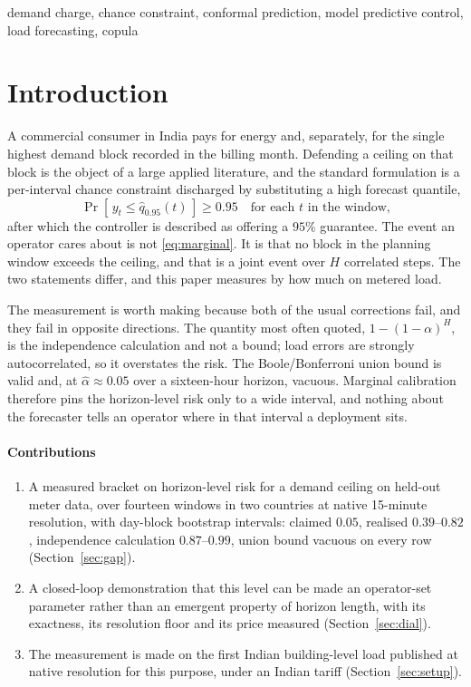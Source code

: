 \documentclass[conference]{IEEEtran}
\begin{document}
\begin{IEEEkeywords}
demand charge, chance constraint, conformal prediction, model predictive
control, load forecasting, copula
\end{IEEEkeywords}

\section{Introduction}

A commercial consumer in India pays for energy and, separately, for the single
highest demand block recorded in the billing month. Defending a ceiling on that
block is the object of a large applied literature, and the standard
formulation is a per-interval chance constraint discharged by substituting a
high forecast quantile,
\begin{equation}
\label{eq:marginal}
\Pr\!\left[\,y_t \le \hat q_{0.95}(t)\,\right] \ge 0.95
\quad \text{for each } t \text{ in the window,}
\end{equation}
after which the controller is described as offering a $95\%$ guarantee. The
event an operator cares about is not \eqref{eq:marginal}. It is that no block
in the planning window exceeds the ceiling, and that is a joint event over $H$
correlated steps. The two statements differ, and this paper measures by how
much on metered load.

The measurement is worth making because both of the usual corrections fail, and
they fail in opposite directions. The quantity most often quoted,
$1-(1-\alpha)^{H}$, is the independence calculation and not a bound; load
errors are strongly autocorrelated, so it overstates the risk. The
Boole/Bonferroni union bound is valid and, at $\hat\alpha\approx0.05$ over a
sixteen-hour horizon, vacuous. Marginal calibration therefore pins the
horizon-level risk only to a wide interval, and nothing about the forecaster
tells an operator where in that interval a deployment sits.

\paragraph*{Contributions}
\begin{enumerate}
\item A measured bracket on horizon-level risk for a demand ceiling on held-out
      meter data, over fourteen windows in two countries at native 15-minute
      resolution, with day-block bootstrap intervals: claimed $0.05$, realised
      $0.39$--$0.82$, independence calculation $0.87$--$0.99$, union bound
      vacuous on every row (Section~\ref{sec:gap}).
\item A closed-loop demonstration that this level can be made an operator-set
      parameter rather than an emergent property of horizon length, with its
      exactness, its resolution floor and its price measured
      (Section~\ref{sec:dial}).
\item The measurement is made on the first Indian building-level load published
      at native resolution for this purpose, under an Indian tariff
      (Section~\ref{sec:setup}).
\end{enumerate}
\end{document}
